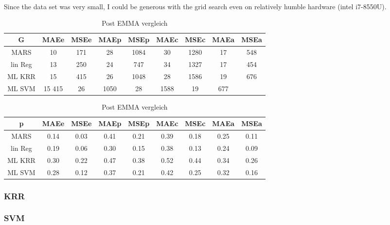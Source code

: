 Since the data set was very small, I could be generous with the grid search even on relatively humble hardware (intel i7-8550U). 

\begin{table}[htb]
	\centering
    \caption{Post EMMA vergleich}
	\label{tab:post-emma}
	\begin{tabular}{c cc cc cc cc}
    \hline\hline
    G&  MAEe&   MSEe&   MAEp&   MSEp&   MAEc&   MSEc&   MAEa& MSEa \\
    \hline
        MARS&   10& 171&    28& 1084&   30& 1280&   17& 548\\
        lin Reg&    13& 250&    24& 747&    34& 1327&   17& 454\\
        ML KRR& 15& 415&    26& 1048&   28& 1586&   19& 676\\
        ML SVM& 15  415&    26& 1050&   28& 1588&   19& 677\\
    \hline\hline
	\end{tabular}
	\begin{tabular}{c cc cc cc cc}
    \hline\hline
    p&  MAEe&   MSEe&   MAEp&   MSEp&   MAEc&   MSEc&   MAEa& MSEa \\
    \hline
        MARS&   0.14&   0.03&   0.41&   0.21&   0.39&   0.18&   0.25&   0.11\\
        lin Reg&    0.19&   0.06&   0.30&   0.15&   0.38&   0.13&   0.24&   0.09\\
        ML KRR& 0.30&   0.22&   0.47&   0.38&   0.52&   0.44&   0.34&   0.26\\
        ML SVM& 0.28&   0.12&   0.37&   0.21&   0.42&   0.25&   0.32&   0.16\\
    \hline\hline
	\end{tabular}
\end{table}
    

\subsubsection{KRR}

\subsubsection{SVM}

